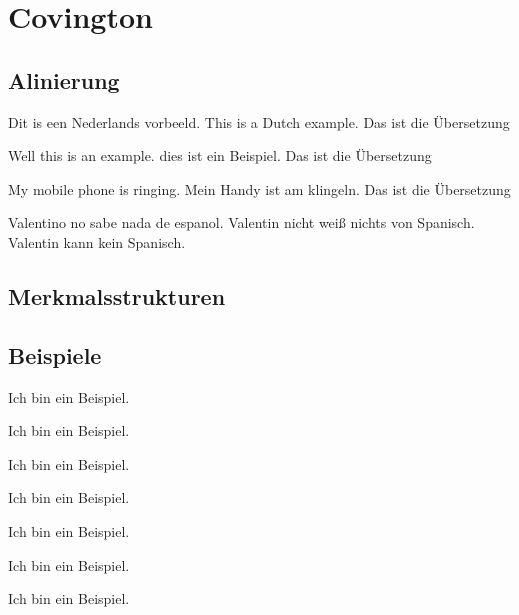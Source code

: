 \section{Covington}

\subsection{Alinierung}


\gll Dit is een  Nederlands vorbeeld.
This is a Dutch example.
\glt Das ist die Übersetzung
\glend


\gll Well this is an example.
{} dies ist ein Beispiel.
\glt Das ist die Übersetzung
\glend


\gll My {mobile phone} {is ringing.}
Mein Handy {ist am klingeln}.
\glt Das ist die Übersetzung
\glend


\gll Valentino no sabe nada de espanol.
Valentin nicht weiß nichts von Spanisch.
\glt Valentin kann kein Spanisch.
\glend

\subsection{Merkmalsstrukturen}





\subsection{Beispiele}

\begin{example}
    Ich bin ein Beispiel.
\end{example}
\begin{example}
    Ich bin ein Beispiel.
\end{example}
\begin{example}
    Ich bin ein Beispiel.
\end{example}

\begin{examples}
    \item Ich bin ein Beispiel.
    \item Ich bin ein Beispiel.
    \item Ich bin ein Beispiel.
\end{examples}

\begin{example}
    Ich bin ein Beispiel.
\end{example}